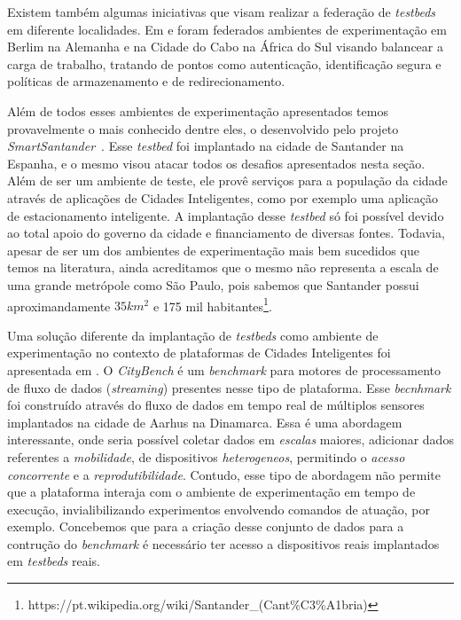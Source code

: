 Existem também algumas iniciativas que visam realizar a federação de \textit{testbeds} em diferente localidades.
Em \cite{mwangama_2013} e \cite{corici_2014} foram federados ambientes de experimentação em Berlim na Alemanha e na Cidade do Cabo na África do Sul visando balancear a carga de trabalho,
tratando de pontos como autenticação, identificação segura e políticas de armazenamento e de redirecionamento.

Além de todos esses ambientes de experimentação apresentados temos provavelmente o mais conhecido dentre eles, o desenvolvido pelo projeto \textit{SmartSantander}~\cite{sanchez_2014}.
Esse \textit{testbed} foi implantado na cidade de Santander na Espanha, e o mesmo visou atacar todos os desafios apresentados nesta seção.
Além de ser um ambiente de teste, ele provê serviços para a população da cidade através de aplicações de Cidades Inteligentes, como por exemplo uma aplicação de estacionamento inteligente.
A implantação desse \textit{testbed} só foi possível devido ao total apoio do governo da cidade e financiamento de diversas fontes.
Todavia, apesar de ser um dos ambientes de experimentação mais bem sucedidos que temos na literatura, ainda acreditamos que o mesmo não representa a escala de uma grande metrópole como
São Paulo, pois sabemos que Santander possui aproximandamente $ 35 km^2 $ e 175 mil habitantes\footnote{https://pt.wikipedia.org/wiki/Santander\_(Cant\%C3\%A1bria)}.

Uma solução diferente da implantação de \textit{testbeds} como ambiente de experimentação no contexto de plataformas de Cidades Inteligentes foi apresentada em \cite{ali_2015}.
O \textit{CityBench} é um \textit{benchmark} para motores de processamento de fluxo de dados (\textit{streaming}) presentes nesse tipo de plataforma.
Esse \textit{becnhmark} foi construído através do fluxo de dados em tempo real de múltiplos sensores implantados na cidade de Aarhus na Dinamarca.
Essa é uma abordagem interessante, onde seria possível coletar dados em \textit{escalas} maiores, adicionar dados referentes a \textit{mobilidade}, de dispositivos \textit{heterogeneos}, permitindo
o \textit{acesso concorrente} e a \textit{reprodutibilidade}.
Contudo, esse tipo de abordagem não permite que a plataforma interaja com o ambiente de experimentação em tempo de execução, invialibilizando experimentos envolvendo comandos de atuação, por exemplo.
Concebemos que para a criação desse conjunto de dados para a contrução do \textit{benchmark} é necessário ter acesso a dispositivos reais implantados em \textit{testbeds} reais.


